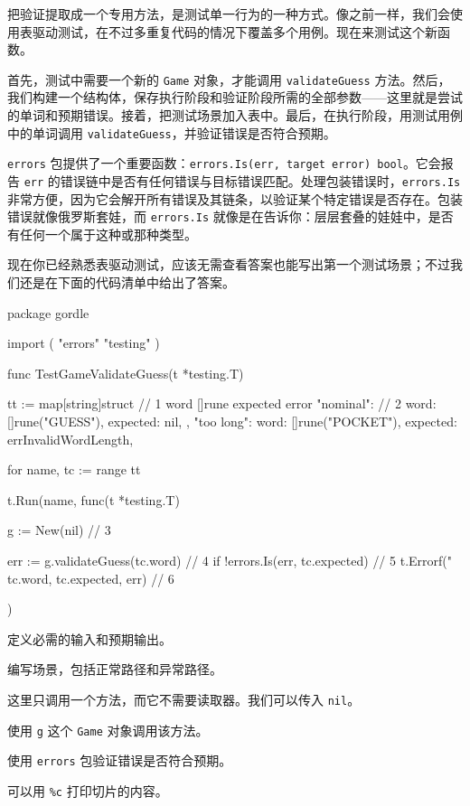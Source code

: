 把验证提取成一个专用方法，是测试单一行为的一种方式。像之前一样，我们会使用表驱动测试，在不过多重复代码的情况下覆盖多个用例。现在来测试这个新函数。

首先，测试中需要一个新的 \texttt{Game} 对象，才能调用 \texttt{validateGuess} 方法。然后，我们构建一个结构体，保存执行阶段和验证阶段所需的全部参数——这里就是尝试的单词和预期错误。接着，把测试场景加入表中。最后，在执行阶段，用测试用例中的单词调用 \texttt{validateGuess}，并验证错误是否符合预期。

\texttt{errors} 包提供了一个重要函数：\texttt{errors.Is(err, target error) bool}。它会报告 \texttt{err} 的错误链中是否有任何错误与目标错误匹配。处理包装错误时，\texttt{errors.Is} 非常方便，因为它会解开所有错误及其链条，以验证某个特定错误是否存在。包装错误就像俄罗斯套娃，而 \texttt{errors.Is} 就像是在告诉你：层层套叠的娃娃中，是否有任何一个属于这种或那种类型。

现在你已经熟悉表驱动测试，应该无需查看答案也能写出第一个测试场景；不过我们还是在下面的代码清单中给出了答案。

\begin{gocode}[title={代码清单 5.16 \texttt{game\_internal\_test.go}：测试 \texttt{validateGuess} 方法}]
package gordle

import (
    "errors"
    "testing"
)

func TestGameValidateGuess(t *testing.T) {
    tt := map[string]struct { // 1
        word     []rune
        expected error
    }{
        "nominal": { // 2
            word:     []rune("GUESS"),
            expected: nil,
        },
        "too long": {
            word:     []rune("POCKET"),
            expected: errInvalidWordLength,
        }
    }

    for name, tc := range tt {
        t.Run(name, func(t *testing.T) {
            g := New(nil) // 3

            err := g.validateGuess(tc.word) // 4
            if !errors.Is(err, tc.expected) { // 5
                t.Errorf("%
                    tc.word, tc.expected, err) // 6
            }
        })
    }
}
\end{gocode}

\begin{codeannotations}
  \item 定义必需的输入和预期输出。
  \item 编写场景，包括正常路径和异常路径。
  \item 这里只调用一个方法，而它不需要读取器。我们可以传入 \texttt{nil}。
  \item 使用 \texttt{g} 这个 \texttt{Game} 对象调用该方法。
  \item 使用 \texttt{errors} 包验证错误是否符合预期。
  \item 可以用 \texttt{\%c} 打印切片的内容。
\end{codeannotations}

